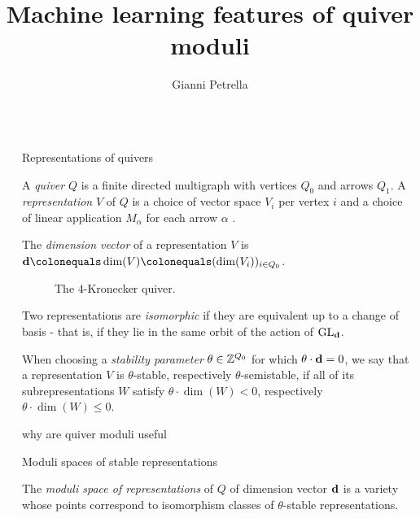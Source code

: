 \documentclass[final]{beamer}
\title{Machine learning features of quiver moduli}
\author{Gianni Petrella \inst{1}}
\institute[shortinst]{\inst{1} University of Luxembourg}
\newcommand{\todo}[1]{{\color{blue}#1}}
\newlength{\sepwidth}
\newlength{\colwidth}
\newcommand{\separatorcolumn}{\begin{column}{\sepwidth}\end{column}}
\begin{document}
\begin{frame}[t]
\begin{columns}[t]
\separatorcolumn

\begin{column}{\colwidth}

  \begin{block}{Representations of quivers}

  A \emph{quiver} $Q$ is a finite directed multigraph with vertices $Q_0$ and arrows $Q_1$.
  A \emph{representation} $V$ of $Q$ is a choice of vector space $V_i$ per vertex $i$
  and a choice of linear application $M_{\alpha}$ for each arrow $\alpha$ \cite{2311.17003}.

  The \emph{dimension vector} of a representation $V$
  is~$\tuple{d} \colonequals \dim(V) \colonequals (\dim(V_i))_{i \in Q_0}$.

    \begin{figure}
      \centering
      \caption{The $4$-Kronecker quiver.}
    \end{figure}

    Two representations are \emph{isomorphic} if they are equivalent up to
    a change of basis -
    that is, if they lie in the same orbit of the action of $\operatorname{GL_{\mathbf{d}}}$.

    When choosing a \emph{stability parameter} $\theta \in \mathbb{Z}^{Q_0}$ for which
    $\theta \cdot \mathbf{d} = 0$, we say that a representation $V$
    is $\theta$-stable, respectively $\theta$-semistable,
    if all of its subrepresentations $W$ satisfy
    $\theta \cdot \dim(W) < 0$, respectively
    $\theta\cdot\dim(W)\leq 0$.

    \todo{why are quiver moduli useful}
    \end{block}

  \begin{block}{Moduli spaces of stable representations}

    The \emph{moduli space of representations} of $Q$ of dimension vector $\mathbf{d}$
    is a variety whose points correspond to isomorphism classes
    of $\theta$-stable representations.


\end{block}
\end{column}
\end{columns}
\end{frame}
\end{document}
